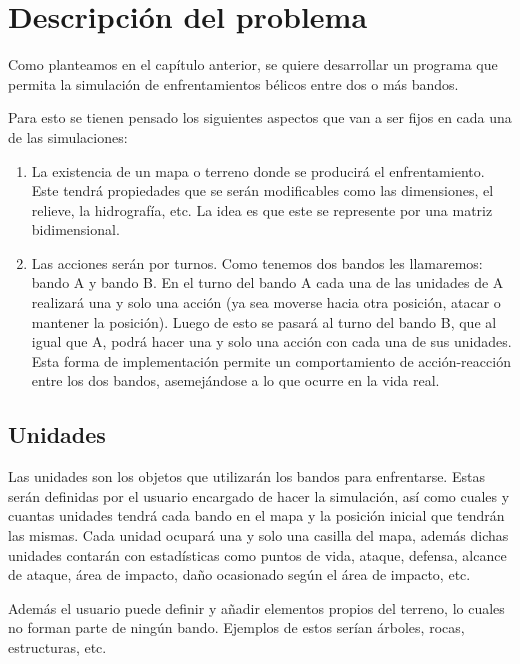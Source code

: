 \chapter{Descripción del problema}

Como planteamos en el cap\'itulo anterior, se quiere desarrollar un programa que permita la simulaci\'on de enfrentamientos b\'elicos entre dos o m\'as bandos.

Para esto se tienen pensado los siguientes aspectos que van a ser fijos en cada una de las simulaciones:

\begin{enumerate}
	\item La existencia de un mapa o terreno donde se producir\'a el enfrentamiento. Este tendr\'a propiedades que se ser\'an modificables como las dimensiones, el relieve, la hidrograf\'ia, etc. La idea es que este se represente por una matriz bidimensional.
	
	\item Las acciones ser\'an por turnos. Como tenemos dos bandos les llamaremos: bando A y bando B. En el turno del bando A cada una de las unidades de A realizar\'a una y solo una acci\'on (ya sea moverse hacia otra posici\'on, atacar o mantener la posici\'on). Luego de esto se pasar\'a al turno del bando B, que al igual que A, podr\'a hacer una y solo una acci\'on con cada una de sus unidades. Esta forma de implementaci\'on permite un comportamiento de acci\'on-reacci\'on entre los dos bandos, asemej\'andose a lo que ocurre en la vida real.
	
\end{enumerate}

\section{Unidades}

Las unidades son los objetos que utilizar\'an los bandos para enfrentarse. Estas ser\'an definidas por el usuario encargado de hacer la simulaci\'on, as\'i como cuales y cuantas unidades tendr\'a cada bando en el mapa y la posici\'on inicial que tendr\'an las mismas. Cada unidad ocupar\'a una y solo una casilla del mapa, adem\'as dichas unidades contar\'an con estad\'isticas como puntos de vida, ataque, defensa, alcance de ataque, \'area de impacto, daño ocasionado seg\'un el \'area de impacto, etc.

Adem\'as el usuario puede definir y a\~{n}adir elementos propios del terreno, lo cuales no forman parte de ning\'un bando. Ejemplos de estos ser\'ian \'arboles, rocas, estructuras, etc.

